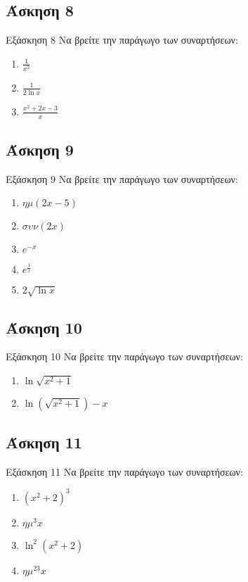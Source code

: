 \documentclass[greek]{beamer}
\begin{document}
\subsection{Άσκηση 8}
\begin{frame}[label=Άσκηση8]{Εξάσκηση 8}
  Να βρείτε την παράγωγο των συναρτήσεων:
  \begin{enumerate}
    \item<1-> $\frac{1}{x^2}$
    \item<2-> $\frac{1}{2\ln x}$
    \item<3-> $\frac{x^2+2x-3}{x}$
  \end{enumerate}

\end{frame}

\subsection{Άσκηση 9}
\begin{frame}[label=Άσκηση9]{Εξάσκηση 9}
  Να βρείτε την παράγωγο των συναρτήσεων:
  \begin{enumerate}
    \item<1-> $ημ(2x-5)$
    \item<2-> $συν(2x)$
    \item<3-> $e^{-x}$
    \item<4-> $e^{\frac{1}{x}}$
    \item<5-> $2\sqrt{\ln x}$
  \end{enumerate}

\end{frame}

\subsection{Άσκηση 10}
\begin{frame}[label=Άσκηση10]{Εξάσκηση 10}
  Να βρείτε την παράγωγο των συναρτήσεων:
  \begin{enumerate}
    \item<1-> $\ln \sqrt{x^2+1}$
    \item<2-> $\ln(\sqrt{x^2+1})-x$
  \end{enumerate}

\end{frame}

\subsection{Άσκηση 11}
\begin{frame}[label=Άσκηση11]{Εξάσκηση 11}
  Να βρείτε την παράγωγο των συναρτήσεων:
  \begin{enumerate}
    \item<1-> $(x^2+2)^3$
    \item<2-> $ημ^3x$
    \item<3-> $\ln^2(x^2+2)$
    \item<4-> $ημ^23x$
  \end{enumerate}

\end{frame}
\end{document}
